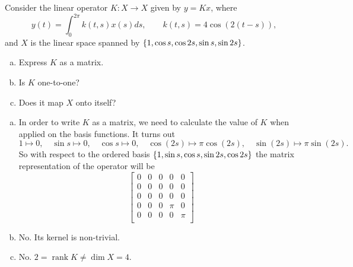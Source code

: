 \begin{problem}
	Consider the linear operator $ K:X\to X $ given by $ y = Kx $, where 
	\[ y(t) = \int_{0}^{2\pi} k(t,s) x(s)ds, \qquad k(t,s) = 4\cos(2(t-s)), \]
	and $ X $ is the linear space spanned by $ \{1,\cos s, \cos 2s, \sin s, \sin 2s\} $.
	\begin{enumerate}[(a)]
		\item Express $ K $ as a matrix.
		\item Is $ K $ one-to-one?
		\item Does it map $ X $ onto itself?
	\end{enumerate}
\end{problem}

\begin{solution}
	\begin{enumerate}[(a)]
		\item In order to write $ K $ as a matrix, we need to calculate the value of $ K $ when applied on the basis functions. It turns out
		\[ 1 \mapsto 0,\quad \sin s\mapsto 0,\quad \cos s \mapsto 0,\quad \cos(2s)\mapsto\pi\cos(2s),\quad \sin(2s)\mapsto\pi\sin(2s). \]
		So with respect to the ordered basis $ \{1,\sin s, \cos s, \sin 2s, \cos 2s\} $ the matrix representation of the operator will be
		\[ \begin{bmatrix}
			0 & 0 & 0 & 0 & 0 \\
			0 & 0 & 0 & 0 & 0 \\
			0 & 0 & 0 & 0 & 0 \\
			0 & 0 & 0 & \pi & 0 \\
			0 & 0 & 0 & 0 & \pi \\
		\end{bmatrix} \]
		
		\item No. Its kernel is non-trivial.
		\item No. $ 2 = \operatorname{rank}K \neq \dim X = 4 $.
	\end{enumerate}
\end{solution}



